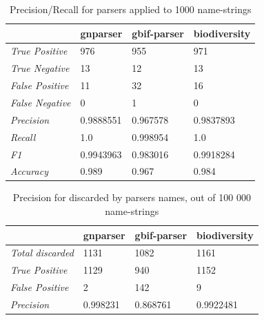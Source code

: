 \documentclass{bmcart}
\begin{document}
\begin{table}[htb]
  \begin{center}
    \caption{Precision/Recall for parsers applied to 1000
    name-strings}\label{table:precision}
    \resizebox{10cm}{!} {
    \begin{tabular}{|l|*{3}{l}|}
      \hline
                             & gnparser & gbif-parser & biodiversity \\
      \hline
      \textit{True Positive} & 976      & 955         & 971          \\
      \textit{True Negative} & 13       & 12          & 13           \\
      \textit{False Positive}& 11       & 32          & 16           \\
      \textit{False Negative}& 0        & 1           & 0            \\
      \textit{Precision}     & 0.9888551& 0.967578    & 0.9837893    \\
      \textit{Recall}        & 1.0      & 0.998954    & 1.0          \\
      \textit{F1}            & 0.9943963& 0.983016    & 0.9918284    \\
      \textit{Accuracy}      & 0.989    & 0.967       & 0.984        \\
      \hline
    \end{tabular}
    }
  \end{center}
\end{table}

\begin{table}[htb]
  \begin{center}
    \caption{Precision for discarded by parsers names, out of 100 000
    name-strings}\label{table:unparsed}
    \resizebox{10cm}{!} {
    \begin{tabular}{| l | *{3}{l} |}
      \hline
                              & gnparser & gbif-parser & biodiversity \\
      \hline
      \textit{Total discarded}& 1131     & 1082        & 1161         \\
      \textit{True Positive}  & 1129     & 940         & 1152         \\
      \textit{False Positive} & 2        & 142         & 9            \\
      \textit{Precision}      & 0.998231 & 0.868761    & 0.9922481    \\
      \hline
    \end{tabular}
  }
  \end{center}
\end{table}
\end{document}
